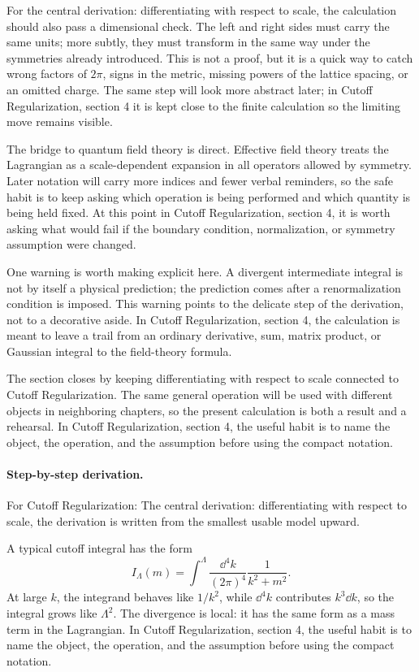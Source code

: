 For the central derivation: differentiating with respect to scale, the calculation should also pass a dimensional check.  The left and right sides must carry the same units; more subtly, they must transform in the same way under the symmetries already introduced.  This is not a proof, but it is a quick way to catch wrong factors of \(2\pi\), signs in the metric, missing powers of the lattice spacing, or an omitted charge.  The same step will look more abstract later; in Cutoff Regularization, section 4 it is kept close to the finite calculation so the limiting move remains visible.

The bridge to quantum field theory is direct.  Effective field theory treats the Lagrangian as a scale-dependent expansion in all operators allowed by symmetry.  Later notation will carry more indices and fewer verbal reminders, so the safe habit is to keep asking which operation is being performed and which quantity is being held fixed.  At this point in Cutoff Regularization, section 4, it is worth asking what would fail if the boundary condition, normalization, or symmetry assumption were changed.

One warning is worth making explicit here.  A divergent intermediate integral is not by itself a physical prediction; the prediction comes after a renormalization condition is imposed.  This warning points to the delicate step of the derivation, not to a decorative aside.  In Cutoff Regularization, section 4, the calculation is meant to leave a trail from an ordinary derivative, sum, matrix product, or Gaussian integral to the field-theory formula.

The section closes by keeping differentiating with respect to scale connected to Cutoff Regularization.  The same general operation will be used with different objects in neighboring chapters, so the present calculation is both a result and a rehearsal.  In Cutoff Regularization, section 4, the useful habit is to name the object, the operation, and the assumption before using the compact notation.



\paragraph{Step-by-step derivation.}

For Cutoff Regularization: The central derivation: differentiating with respect to scale, the derivation is written from the smallest usable model upward.

A typical cutoff integral has the form
\[
  I_\Lambda(m)=\int^{\Lambda}\frac{\dd^4k}{(2\pi)^4}\frac{1}{k^2+m^2}.
\]
At large \(k\), the integrand behaves like \(1/k^2\), while \(\dd^4k\) contributes \(k^3\dd k\), so the integral grows like \(\Lambda^2\).  The divergence is local: it has the same form as a mass term in the Lagrangian.  In Cutoff Regularization, section 4, the useful habit is to name the object, the operation, and the assumption before using the compact notation.

